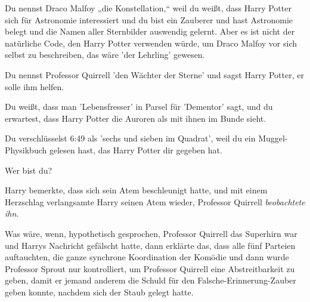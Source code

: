 Du nennst Draco Malfoy „die Konstellation,“ weil du weißt, dass Harry Potter sich für Astronomie interessiert und du bist ein Zauberer und hast Astronomie belegt und die Namen aller Sternbilder auswendig gelernt. Aber es ist nicht der natürliche Code, den Harry Potter verwenden würde, um Draco Malfoy vor sich selbst zu beschreiben, das wäre 'der Lehrling' gewesen.

Du nennst Professor Quirrell 'den Wächter der Sterne' und sagst Harry Potter, er solle ihm helfen.

Du weißt, dass man 'Lebensfresser' in Parsel für 'Dementor' sagt, und du erwartest, dass Harry Potter die Auroren als mit ihnen im Bunde sieht.

Du verschlüsselst 6:49 als 'sechs und sieben im Quadrat', weil du ein Muggel-Physikbuch gelesen hast, das Harry Potter dir gegeben hat.

Wer bist du?

Harry bemerkte, dass sich sein Atem beschleunigt hatte, und mit einem Herzschlag verlangsamte Harry seinen Atem wieder, Professor Quirrell \emph{beobachtete ihn}.

Was wäre, wenn, hypothetisch gesprochen, Professor Quirrell das Superhirn war und Harrys Nachricht gefälscht hatte, dann erklärte das, dass alle fünf Parteien auftauchten, die ganze synchrone Koordination der Komödie und dann wurde Professor Sprout nur kontrolliert, um Professor Quirrell eine Abstreitbarkeit zu geben, damit er jemand anderem die Schuld für den Falsche-Erinnerung-Zauber geben konnte, nachdem sich der Staub gelegt hatte.

